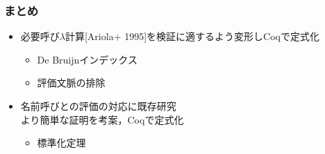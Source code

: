 \documentclass[dvipdfmx,cjk,xcolor=dvipsnames,envcountsect,notheorems,12pt]{beamer}
\theoremstyle{definition}
\begin{document}
\begin{frame}
	\frametitle{まとめ}
	\begin{itemize}
		\item 必要呼び$\lambda$計算[Ariola+ 1995]を検証に適するよう変形しCoqで定式化
			\begin{itemize}
				\item De Bruijnインデックス
				\item 評価文脈の排除
			\end{itemize}
		\item 名前呼びとの評価の対応に既存研究\\より簡単な証明を考案，Coqで定式化
			\begin{itemize}
				\item 標準化定理
			\end{itemize}
	\end{itemize}
\end{frame}
\end{document}
